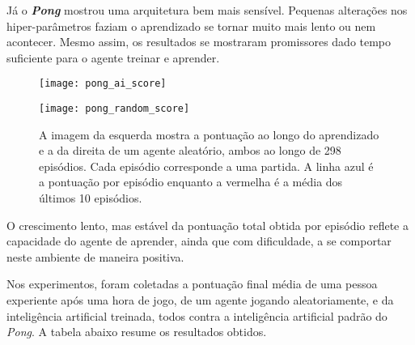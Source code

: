 Já o \textbf{\textit{Pong}} mostrou uma arquitetura bem mais sensível.
Pequenas alterações nos hiper-parâmetros faziam o aprendizado se tornar muito mais lento ou nem acontecer.
Mesmo assim, os resultados se mostraram promissores dado tempo suficiente para o agente treinar e aprender.


\begin{figure}[h!]
  \begin{minipage}[b]{.5\textwidth}
  \centering
  \texttt{[image: pong\_ai\_score]}
  \end{minipage}
  \hfill
  \begin{minipage}[b]{.5\textwidth}
  \centering
  \texttt{[image: pong\_random\_score]}
  \end{minipage}
  \caption{A imagem da esquerda mostra a pontuação ao longo do aprendizado e a da direita de um agente aleatório, ambos ao longo de 298 episódios. Cada episódio corresponde a uma partida. A linha azul é a pontuação por episódio enquanto a vermelha é a média dos últimos 10 episódios.}
  \label{fig:pong_score}
\end{figure}


O crescimento lento, mas estável da pontuação total obtida por episódio reflete a capacidade do agente de aprender, ainda que com dificuldade, a se comportar neste ambiente de maneira positiva.

Nos experimentos, foram coletadas a pontuação final média de uma pessoa experiente após uma hora de jogo, de um agente jogando aleatoriamente, e da inteligência artificial treinada, todos contra a inteligência artificial padrão do \textit{Pong}.
A tabela abaixo resume os resultados obtidos.

